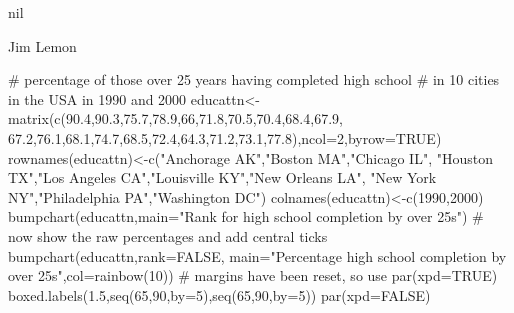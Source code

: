 \begin{Value}
nil
\end{Value}
\begin{Author}\relax
Jim Lemon
\end{Author}
\begin{SeeAlso}\relax
{}
\end{SeeAlso}
\begin{Examples}
\begin{ExampleCode}
 # percentage of those over 25 years having completed high school
 # in 10 cities in the USA in 1990 and 2000
 educattn<-matrix(c(90.4,90.3,75.7,78.9,66,71.8,70.5,70.4,68.4,67.9,
  67.2,76.1,68.1,74.7,68.5,72.4,64.3,71.2,73.1,77.8),ncol=2,byrow=TRUE)
 rownames(educattn)<-c("Anchorage AK","Boston MA","Chicago IL",
  "Houston TX","Los Angeles CA","Louisville KY","New Orleans LA",
  "New York NY","Philadelphia PA","Washington DC")
 colnames(educattn)<-c(1990,2000)
 bumpchart(educattn,main="Rank for high school completion by over 25s")
 # now show the raw percentages and add central ticks
 bumpchart(educattn,rank=FALSE,
  main="Percentage high school completion by over 25s",col=rainbow(10))
 # margins have been reset, so use
 par(xpd=TRUE)
 boxed.labels(1.5,seq(65,90,by=5),seq(65,90,by=5))
 par(xpd=FALSE)
\end{ExampleCode}
\end{Examples}

